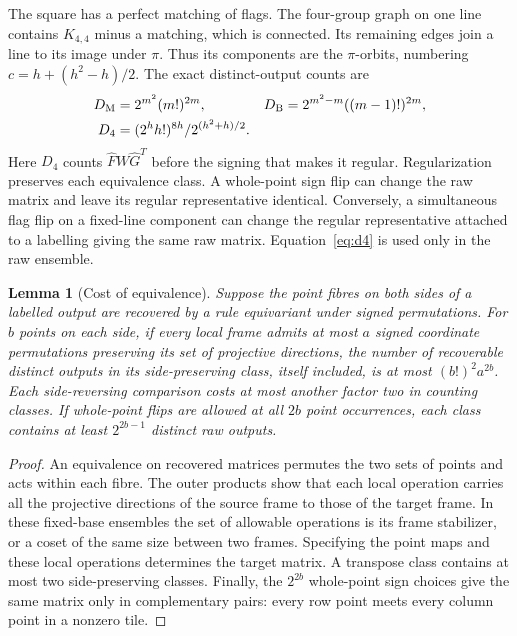 \documentclass[11pt,reqno]{amsart}
\newtheorem{lemma}[theorem]{Lemma}
\theoremstyle{remark}\newtheorem{remark}[theorem]{Remark}
\begin{document}
The square has a perfect matching of flags. The four-group graph on one line contains \(K_{4,4}\) minus a matching, which is connected. Its remaining edges join a line to its image under \(\pi\). Thus its components are the \(\pi\)-orbits, numbering \(c=h+(h^2-h)/2\). The exact distinct-output counts are
\begin{align}
 D_{\rm M}&=2^{m^2}(m!)^{2m},&
 D_{\rm B}&=2^{m^2-m}((m-1)!)^{2m},\label{eq:dm}\\
 D_4&=(2^h h!)^{8h}/2^{(h^2+h)/2}.\label{eq:d4}
\end{align}
Here \(D_4\) counts \(\widehat F W\widehat G^T\) before the signing that makes it regular. Regularization preserves each equivalence class. A whole-point sign flip can change the raw matrix and leave its regular representative identical. Conversely, a simultaneous flag flip on a fixed-line component can change the regular representative attached to a labelling giving the same raw matrix. Equation~\eqref{eq:d4} is used only in the raw ensemble.

\begin{lemma}[Cost of equivalence]\label{lem:mult}
Suppose the point fibres on both sides of a labelled output are recovered by a rule equivariant under signed permutations. For \(b\) points on each side, if every local frame admits at most \(a\) signed coordinate permutations preserving its set of projective directions, the number of recoverable distinct outputs in its side-preserving class, itself included, is at most \((b!)^2a^{2b}\). Each side-reversing comparison costs at most another factor two in counting classes. If whole-point flips are allowed at all \(2b\) point occurrences, each class contains at least \(2^{2b-1}\) distinct raw outputs.
\end{lemma}
\begin{proof}
An equivalence on recovered matrices permutes the two sets of points and acts within each fibre. The outer products show that each local operation carries all the projective directions of the source frame to those of the target frame. In these fixed-base ensembles the set of allowable operations is its frame stabilizer, or a coset of the same size between two frames. Specifying the point maps and these local operations determines the target matrix. A transpose class contains at most two side-preserving classes. Finally, the \(2^{2b}\) whole-point sign choices give the same matrix only in complementary pairs: every row point meets every column point in a nonzero tile.
\end{proof}
\end{document}

